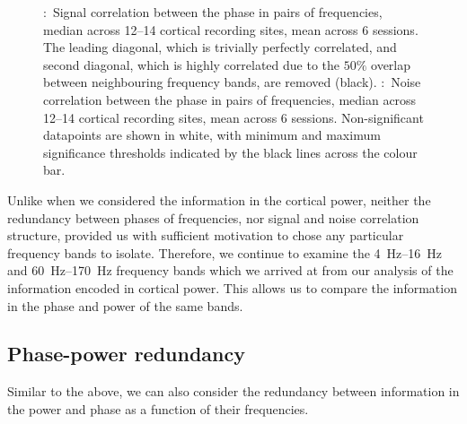 \begin{figure}[htbp]
    \centering
    \hspace*{\fill}
    \hspace*{\fill}\hspace{.2cm}\hspace*{\fill}
    \hspace*{\fill}
    \caption{
\protect{}:~Signal correlation between the phase in pairs of frequencies, median across \numrange{12}{14} cortical recording sites, mean across \num{6} sessions.
The leading diagonal, which is trivially perfectly correlated, and second diagonal, which is highly correlated due to the $50\%$ overlap between neighbouring frequency bands, are removed (black).
\protect{}:~Noise correlation between the phase in pairs of frequencies, median across \numrange{12}{14} cortical recording sites, mean across \num{6} sessions.
Non-significant datapoints are shown in white, with minimum and maximum significance thresholds indicated by the black lines across the colour bar.
}
\label{fig:lam_noisesignal_corr_phase}
\end{figure}


Unlike when we considered the information in the cortical power, neither the redundancy between phases of frequencies, nor signal and noise correlation structure, provided us with sufficient motivation to chose any particular frequency bands to isolate.
Therefore, we continue to examine the \SIrange{4}{16}{Hz} and \SIrange{60}{170}{Hz} frequency bands which we arrived at from our analysis of the information encoded in cortical power.
This allows us to compare the information in the phase and power of the same bands.


\subsection{Phase-power redundancy}

Similar to the above, we can also consider the redundancy between information in the power and phase as a function of their frequencies.


